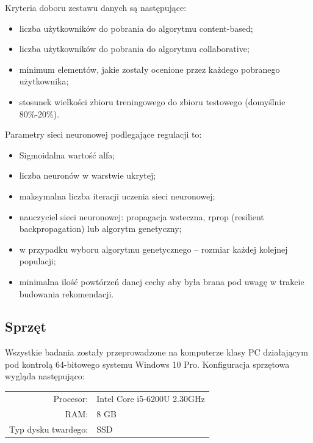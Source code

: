 \documentclass[twoside]{iisthesis}
\begin{document}
		 Kryteria doboru zestawu danych są następujące:
		 
		 \begin{itemize}
		 	\item liczba użytkowników do pobrania do algorytmu content-based;
		 	\item liczba użytkowników do pobrania do algorytmu collaborative;
		 	\item minimum elementów, jakie zostały ocenione przez każdego pobranego użytkownika;
		 	\item stosunek wielkości zbioru treningowego do zbioru testowego (domyślnie 80\%-20\%).
		 \end{itemize}
		 
		 Parametry sieci neuronowej podlegające regulacji to:
		 
		 \begin{itemize}
		 	\item Sigmoidalna wartość alfa;
		 	\item liczba neuronów w warstwie ukrytej;
		 	\item maksymalna liczba iteracji uczenia sieci neuronowej;
		 	\item nauczyciel sieci neuronowej: propagacja wsteczna, rprop (resilient backpropagation) lub algorytm genetyczny;
		 	\item w przypadku wyboru algorytmu genetycznego -- rozmiar każdej kolejnej populacji;
		 	\item minimalna ilość powtórzeń  danej cechy aby była brana pod uwagę w trakcie budowania rekomendacji.
		 \end{itemize}	 
		
		\subsection{Sprzęt}
		
		Wszystkie badania zostały przeprowadzone na komputerze klasy PC działającym pod kontrolą 64-bitowego systemu Windows 10 Pro. Konfiguracja sprzętowa wygląda następująco:
		
		\begin{center}
			\begin{tabular}{ r  l  }
				Procesor: & Intel Core i5-6200U 2.30GHz \\ 
				RAM: & 8 GB \\  
				Typ dysku twardego: & SSD     
			\end{tabular}
		\end{center}
	
\end{document}
